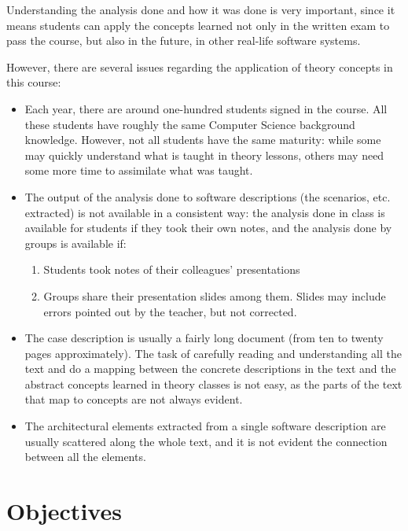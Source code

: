 Understanding the analysis done and how it was done is very important, since it means students can apply the concepts learned not only in the written exam to pass the course, but also in the future, in other real-life software systems.

However, there are several issues regarding the application of theory concepts in this course:
\begin{itemize}
\item Each year, there are around one-hundred students signed in the course. All these students have roughly the same Computer Science background knowledge. However, not all students have the same maturity: while some may quickly understand what is taught in theory lessons, others may need some more time to assimilate what was taught.

\item The output of the analysis done to software descriptions (the scenarios, etc. extracted) is not available in a consistent way: the analysis done in class is available for students if they took their own notes, and the analysis done by groups is available if:
\begin{enumerate}
\item Students took notes of their colleagues' presentations 

\item Groups share their presentation slides among them. Slides may include errors pointed out by the teacher, but not corrected.
\end{enumerate} 

\item The case description is usually a fairly long document (from ten to twenty pages approximately). The task of carefully reading and understanding all the text and do a mapping between the concrete descriptions in the text and the abstract concepts learned in theory classes is not easy, as the parts of the text that map to concepts are not always evident.

\item The architectural elements extracted from a single software description are usually scattered along the whole text, and it is not evident the connection between all the elements.
\end{itemize}

\section{Objectives}
\label{chapter:objectives}

